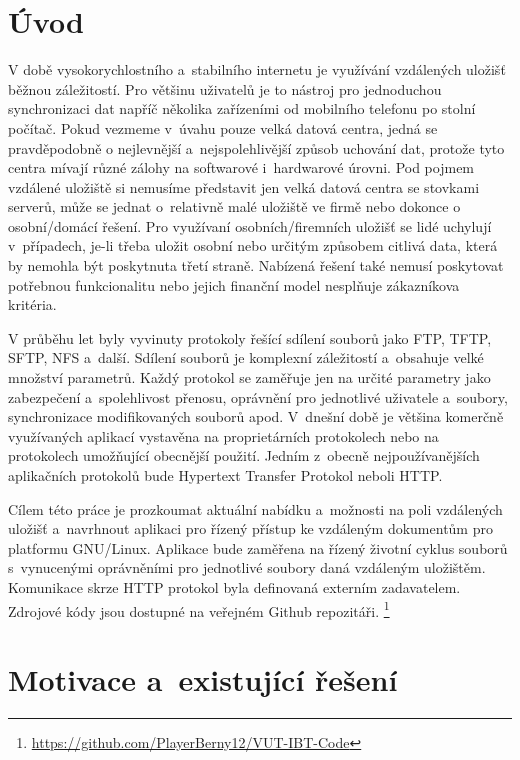 \chapter{Úvod}

V době vysokorychlostního a stabilního internetu je využívání vzdálených uložišť běžnou záležitostí. Pro většinu uživatelů je to nástroj
pro jednoduchou synchronizaci dat napříč několika zařízeními od mobilního telefonu po stolní počítač. Pokud vezmeme v úvahu pouze velká datová centra,
jedná se pravděpodobně o nejlevnější a nejspolehlivější způsob uchování dat, protože tyto centra mívají různé zálohy na softwarové i hardwarové úrovni.
Pod pojmem vzdálené uložiště si nemusíme představit jen velká datová centra se stovkami serverů, může se jednat o relativně malé uložiště
ve firmě nebo dokonce o osobní/domácí řešení. Pro využívaní osobních/firemních uložišť se lidé uchylují v případech, je-li třeba uložit osobní nebo
určitým způsobem citlivá data, která by nemohla být poskytnuta třetí straně. Nabízená řešení také nemusí poskytovat potřebnou funkcionalitu nebo jejich finanční model
nesplňuje zákazníkova kritéria.

V průběhu let byly vyvinuty protokoly řešící sdílení souborů jako FTP, TFTP, SFTP, NFS a další. Sdílení souborů je komplexní záležitostí a obsahuje
velké množství parametrů. Každý protokol se zaměřuje jen na určité parametry jako zabezpečení a spolehlivost přenosu, oprávnění pro jednotlivé
uživatele a soubory, synchronizace modifikovaných souborů apod. V dnešní době je většina komerčně využívaných aplikací vystavěna na proprietárních protokolech nebo
na protokolech umožňující obecnější použití. Jedním z obecně nejpoužívanějších aplikačních protokolů bude Hypertext Transfer Protokol neboli HTTP.

Cílem této práce je prozkoumat aktuální nabídku a možnosti na poli vzdálených uložišť a navrhnout aplikaci pro řízený přístup ke vzdáleným dokumentům pro
platformu \mbox{GNU/Linux}. Aplikace bude zaměřena na řízený životní cyklus souborů s vynucenými oprávněními pro jednotlivé soubory daná vzdáleným uložištěm.
Komunikace skrze HTTP protokol byla definovaná externím zadavatelem. Zdrojové kódy jsou dostupné na veřejném Github repozitáři.
\footnote{\url{https://github.com/PlayerBerny12/VUT-IBT-Code}}

\chapter{Motivace a existující řešení}

